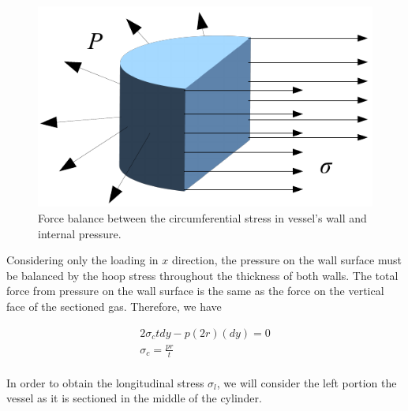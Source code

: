 \documentclass[
10pt,
a4paper,
openany,
svgnames,
]{book} %
\begin{document}
\begin{figure}[h]
  \centering
  \includegraphics[scale=0.7]{pictures/Combined-loadings/cylindrical-vessel-circ}
  \caption{Force balance between the circumferential stress in vessel's wall and internal pressure.}
  \label{fig: cylindrical vessel circumferential}
\end{figure}

Considering only the loading in $x$ direction, the pressure on the wall surface must be balanced by the hoop stress throughout the thickness of both walls. The total force from pressure on the wall surface is the same as the force on the vertical face of the sectioned gas. Therefore, we have

\begin{equation}
  \begin{gathered}
    2\sigma _ctdy - p(2r)(dy) = 0 \\ 
    {\sigma _c} = \frac{{pr}}{t} \\ 
  \end{gathered}
\end{equation}

In order to obtain the longitudinal stress $\sigma_l$, we will consider the left portion the vessel as it is sectioned in the middle of the cylinder.
\end{document}
